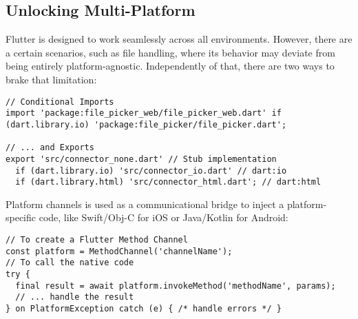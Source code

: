 
\newpage
\subsection{Unlocking Multi-Platform}

Flutter is designed to work seamlessly across all environments. However, there are a certain scenarios, such as file
handling, where its behavior may deviate from being entirely platform-agnostic. Independently of that, there are two
ways to brake that limitation:

\begin{lstlisting}
// Conditional Imports
import 'package:file_picker_web/file_picker_web.dart' if (dart.library.io) 'package:file_picker/file_picker.dart';

// ... and Exports
export 'src/connector_none.dart' // Stub implementation
  if (dart.library.io) 'src/connector_io.dart' // dart:io
  if (dart.library.html) 'src/connector_html.dart'; // dart:html
\end{lstlisting}

\noindent Platform channels is used as a communicational bridge to inject a platform-specific code, like Swift/Obj-C 
for iOS or Java/Kotlin for Android:

\begin{lstlisting}
// To create a Flutter Method Channel
const platform = MethodChannel('channelName');
// To call the native code
try {
  final result = await platform.invokeMethod('methodName', params);
  // ... handle the result
} on PlatformException catch (e) { /* handle errors */ }
\end{lstlisting}